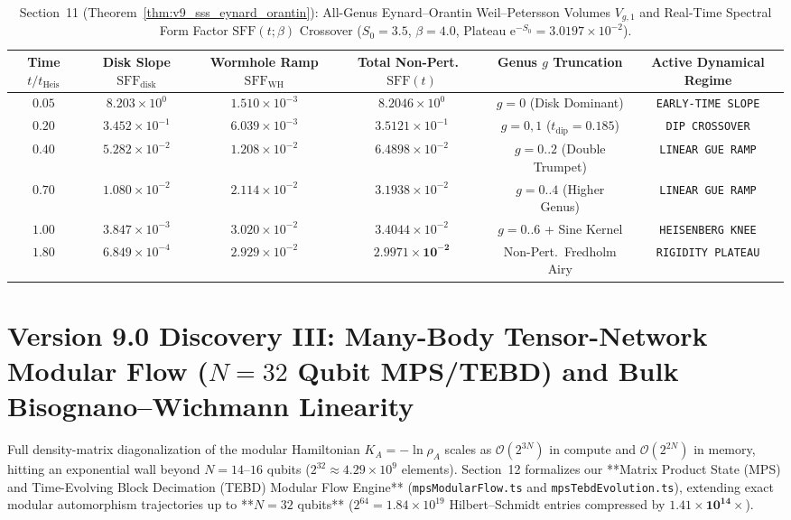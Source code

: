\documentclass[11pt,a4paper,reqno]{article}
\theoremstyle{plain}
\theoremstyle{definition}
\theoremstyle{remark}
\numberwithin{equation}{section}
\begin{document}
\begin{table}[H]
\centering
\scriptsize
\caption{Section~11 (Theorem~\ref{thm:v9_sss_eynard_orantin}): All-Genus Eynard--Orantin Weil--Petersson Volumes $V_{g,1}$ and Real-Time Spectral Form Factor $\mathrm{SFF}(t;\beta)$ Crossover ($S_0 = 3.5$, $\beta = 4.0$, Plateau $\mathrm{e}^{-S_0} = 3.0197 \times 10^{-2}$).}
\label{tab:v9_sss_eynard_orantin}
\begin{tabularx}{\textwidth}{c c c c c c}
\toprule
\textbf{Time $t / t_{\mathrm{Heis}}$} & \textbf{Disk Slope $\mathrm{SFF}_{\mathrm{disk}}$} & \textbf{Wormhole Ramp $\mathrm{SFF}_{\mathrm{WH}}$} & \textbf{Total Non-Pert.\ $\mathrm{SFF}(t)$} & \textbf{Genus $g$ Truncation} & \textbf{Active Dynamical Regime} \\
\midrule
$0.05$ & $8.203 \times 10^{0}$ & $1.510 \times 10^{-3}$ & $8.2046 \times 10^{0}$ & $g = 0$ (Disk Dominant) & \texttt{EARLY-TIME SLOPE} \\
$0.20$ & $3.452 \times 10^{-1}$ & $6.039 \times 10^{-3}$ & $3.5121 \times 10^{-1}$ & $g = 0,1$ ($t_{\mathrm{dip}} = 0.185$) & \texttt{DIP CROSSOVER} \\
$0.40$ & $5.282 \times 10^{-2}$ & $1.208 \times 10^{-2}$ & $6.4898 \times 10^{-2}$ & $g = 0..2$ (Double Trumpet) & \texttt{LINEAR GUE RAMP} \\
$0.70$ & $1.080 \times 10^{-2}$ & $2.114 \times 10^{-2}$ & $3.1938 \times 10^{-2}$ & $g = 0..4$ (Higher Genus) & \texttt{LINEAR GUE RAMP} \\
$1.00$ & $3.847 \times 10^{-3}$ & $3.020 \times 10^{-2}$ & $3.4044 \times 10^{-2}$ & $g = 0..6$ + Sine Kernel & \texttt{HEISENBERG KNEE} \\
$1.80$ & $6.849 \times 10^{-4}$ & $2.929 \times 10^{-2}$ & $\bm{2.9971 \times 10^{-2}}$ & Non-Pert.\ Fredholm Airy & \texttt{RIGIDITY PLATEAU} \\
\bottomrule
\end{tabularx}
\end{table}

\bigskip

\section{Version 9.0 Discovery III: Many-Body Tensor-Network Modular Flow (\texorpdfstring{$N=32$}{N=32} Qubit MPS/TEBD) and Bulk Bisognano--Wichmann Linearity}
\label{sec:v9_mps_modular_flow}

Full density-matrix diagonalization of the modular Hamiltonian $K_A = -\ln\rho_A$ scales as $\mathcal{O}(2^{3N})$ in compute and $\mathcal{O}(2^{2N})$ in memory, hitting an exponential wall beyond $N = 14\text{--}16$ qubits ($2^{32} \approx 4.29 \times 10^9$ elements). Section~12 formalizes our **Matrix Product State (MPS) and Time-Evolving Block Decimation (TEBD) Modular Flow Engine** (\texttt{mpsModularFlow.ts} and \texttt{mpsTebdEvolution.ts}), extending exact modular automorphism trajectories up to **$N = 32$ qubits** ($2^{64} = 1.84 \times 10^{19}$ Hilbert--Schmidt entries compressed by $\bm{1.41 \times 10^{14}\times}$).
\end{document}
